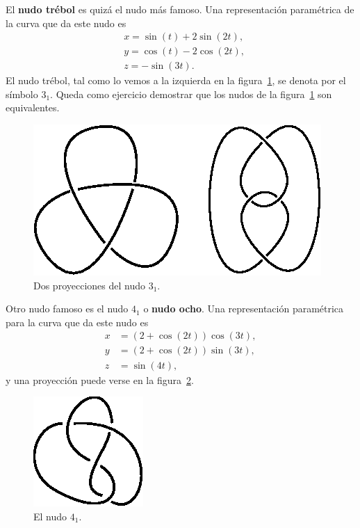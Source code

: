 \documentclass[graybox]{svmult}
\begin{document}
\begin{example}
    El \textbf{nudo trébol} es quizá el nudo más famoso. Una representación
    paramétrica de la curva que da este nudo es 
    \begin{align*}
        &x=\sin(t)+2\sin(2t),\\
        &y=\cos(t)-2\cos(2t),\\
        &z=-\sin(3t).
    \end{align*}
	El nudo trébol, tal como lo vemos a la izquierda en la
	figura~\ref{fig:trefoil}, se denota por el símbolo $3_1$.  Queda como
	ejercicio demostrar que los nudos de la figura~\ref{fig:trefoil} son
	equivalentes.
\end{example}

\begin{example}
	\begin{figure}[ht]
		\centering
		\includegraphics[scale=0.6]{images/trefoils}
		\caption{Dos proyecciones del nudo $3_1$.}
		\label{fig:trefoil}
	\end{figure}

    Otro nudo famoso es el nudo $4_1$ o \textbf{nudo ocho}. Una
    representación paramétrica para la curva que da este nudo es
	\begin{align*}
		x&=(2+\cos(2t))\cos(3t),\\
		y&=(2+\cos(2t))\sin(3t),\\
		z&=\sin(4t),
	\end{align*}
	y una proyección puede verse en la figura~\ref{fig:4_1:unoriented}.
	\begin{figure}[ht]
		\centering
		\includegraphics[scale=0.7]{images/4_1unoriented}
		\caption{El nudo $4_1$.}
		\label{fig:4_1:unoriented}
	\end{figure}
\end{example}
\end{document}
